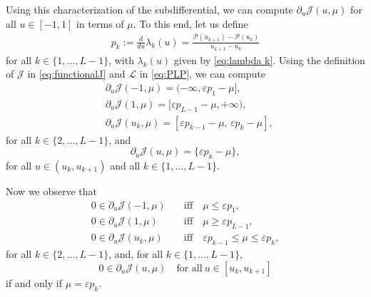 \documentclass[twocolumn]{autart}    %
\begin{document}
Using this characterization of the subdifferential, we can compute $\partial_u\mathcal{J}(u,\mu)$ for all $u\in [-1,1]$ in terms of $\mu$. To this end, let us define
\begin{align*} 
	p_k := \frac{d}{du}\lambda_k(u) = \frac{\mathcal{P}(u_{k+1}) - \mathcal{P} (u_k) }{u_{k+1} - u_k} 
\end{align*} 
for all $k\in \{1, \ldots, L-1\}$, with $\lambda_k(u)$ given by \eqref{eq:lambda k}. Using the definition of $\mathcal{J}$ in \eqref{eq:functionalJ} and $\mathcal{L}$ in \eqref{eq:PLP}, we can compute
\begin{align*}
	&\partial_u \mathcal{J} (-1,\mu) = (-\infty, \varepsilon p_1 -\mu], 
	\\[5pt]
	&\partial_u \mathcal{J} (1,\mu) = [\varepsilon p_{L-1} -\mu, +\infty), 
	\\[5pt]
	&\partial_u \mathcal{J} (u_k,\mu) = [\varepsilon p_{k-1} -\mu,  \, \varepsilon p_k -\mu],
\end{align*}
for all $k\in \{ 2, \ldots, L-1\}$, and
\begin{equation*}
	\partial_u \mathcal{J}(u,\mu) = \{\varepsilon p_k -\mu\},
\end{equation*}
for all $u\in (u_k, u_{k+1})$ and all $k\in \{ 1, \ldots, L-1 \}$.

Now we observe that
\begin{equation}\label{eq:subdiff}
	\begin{array}{ll}
		0\in \partial_u \mathcal{J} (-1,\mu) & \quad\text{iff}\quad  \mu\leq  \varepsilon p_1, 
		\\[5pt]
		0\in \partial_u \mathcal{J} (1,\mu) & \quad\text{iff} \quad \mu\geq  \varepsilon p_{L-1}, 
		\\[5pt]
		0\in \partial_u \mathcal{J} (u_k,\mu) & \quad\text{iff} \quad  \varepsilon p_{k-1} \leq \mu \leq \varepsilon p_k , 
	\end{array} 
\end{equation}
for all $k\in \{ 2, \ldots, L-1\}$,  and, for all $k\in \{ 1, \ldots, L-1 \}$,
\begin{equation}\label{eq:subdiff2}
	0\in \partial_u \mathcal{J} (u,\mu) \quad \text{for all}\  u\in [u_k, u_{k+1}]
\end{equation}
if and only if $\mu= \varepsilon p_k$.
\end{document}
